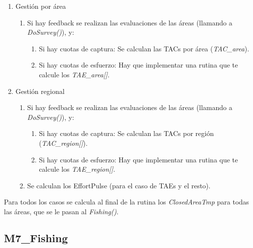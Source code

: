 \documentclass[12pt, oneside, a4paper]{article}
\begin{document}
\begin{enumerate}
						\item Gestión por área
							\begin{enumerate}
								\item Si hay feedback se realizan las evaluaciones de las áreas (llamando a \emph{DoSurvey()}), y:
								\begin{enumerate}
									\item Si hay cuotas de captura: Se calculan las TACs por área (\emph{TAC\_area}).
									\item Si hay cuotas de esfuerzo: Hay que implementar una rutina que te calcule los \emph{TAE\_area[]}.
								\end{enumerate}
							\end{enumerate}
						\item Gestión regional
							\begin{enumerate}
								\item Si hay feedback se realizan las evaluaciones de las áreas (llamando a \emph{DoSurvey()}), y:
								\begin{enumerate}
									\item Si hay cuotas de captura: Se calculan las TACs por región (\emph{TAC\_region[]}).
									\item Si hay cuotas de esfuerzo: Hay que implementar una rutina que te calcule los \emph{TAE\_region[]}.
								\end{enumerate}
								\item Se calculan los EffortPulse (para el caso de TAEs y el resto). 
							\end{enumerate}
					\end{enumerate}
			Para todos los casos se calcula al final de la rutina los \emph{ClosedAreaTmp} para todas las áreas, que se le pasan al \emph{Fishing()}.
				
		\subsection{M7\_Fishing}
\end{document}
